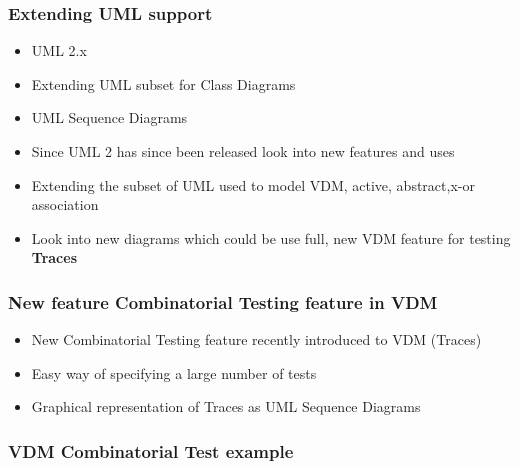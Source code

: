 %
%
\frame
{
  \frametitle{Extending UML support}

  \begin{itemize}
	\itemsep=1cm
  		\item<1-> UML 2.x
  		\item<2-> Extending UML subset for Class Diagrams
  		\item<3-> UML Sequence Diagrams
	  	
  \end{itemize}


}

\note
{

  \begin{itemize}
  		\item Since UML 2 has since been released look into new features and uses
  		\item Extending the subset of UML used to model VDM, active, abstract,x-or association
  		\item Look into new diagrams which could be use full, new VDM feature for testing \textbf{Traces}
	  	
  \end{itemize}

}


%
%
\frame
{
  \frametitle{New feature Combinatorial Testing feature in VDM}

  \begin{itemize}
  		\item New Combinatorial Testing feature recently introduced to VDM (Traces)
  		\item Easy way of specifying a large number of tests
  		\item Graphical representation of Traces as UML Sequence Diagrams
	  	
  \end{itemize}


}

%
%
\frame
{
  \frametitle{VDM Combinatorial Test example}
\begin{center}

\end{center}
}


